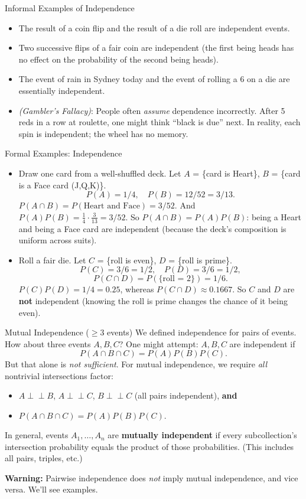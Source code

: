 \documentclass[aspectratio=169,11pt]{beamer} %
\newcommand{\indep}{\perp\!\!\!\perp} %
\begin{document}
\begin{frame}{Informal Examples of Independence}
\begin{itemize}
    \item The result of a coin flip and the result of a die roll are independent events.
    \item Two successive flips of a fair coin are independent (the first being heads has no effect on the probability of the second being heads).
    \item The event of rain in Sydney today and the event of rolling a 6 on a die are essentially independent.
    \item \textit{(Gambler's Fallacy)}: People often \emph{assume} dependence incorrectly. After 5 reds in a row at roulette, one might think ``black is due'' next. In reality, each spin is independent; the wheel has no memory.
\end{itemize}
\end{frame}

\begin{frame}{Formal Examples: Independence}
\begin{itemize}
    \item Draw one card from a well-shuffled deck. Let $A$ = \{card is Heart\}, $B$ = \{card is a Face card (J,Q,K)\}. 
    \[P(A)=1/4, \quad P(B)=12/52 = 3/13.\] 
    $P(A \cap B) = P(\text{Heart and Face}) = 3/52$. And $P(A)P(B) = \frac{1}{4}\cdot\frac{3}{13} = 3/52$. So $P(A \cap B) = P(A)P(B)$: being a Heart and being a Face card are independent (because the deck's composition is uniform across suits).
    
    \item Roll a fair die. Let $C$ = \{roll is even\}, $D$ = \{roll is prime\}. 
    \[P(C) = 3/6 = 1/2, \quad P(D) = 3/6 = 1/2,\] 
    \[P(C \cap D) = P(\{\text{roll = 2}\}) = 1/6.\] 
    $P(C)P(D) = 1/4 = 0.25$, whereas $P(C \cap D) \approx 0.1667$. So $C$ and $D$ are \textbf{not} independent (knowing the roll is prime changes the chance of it being even).
\end{itemize}
\end{frame}

\begin{frame}{Mutual Independence ($\ge 3$ events)}
We defined independence for pairs of events. How about three events $A, B, C$? One might attempt: $A, B, C$ are independent if 
\[ P(A \cap B \cap C) = P(A)P(B)P(C). \]
But that alone is \emph{not sufficient}. For mutual independence, we require \textit{all} nontrivial intersections factor:
\begin{itemize}
    \item $A \indep B$, $A \indep C$, $B \indep C$ (all pairs independent), \textbf{and}
    \item $P(A \cap B \cap C) = P(A)P(B)P(C).$
\end{itemize}
In general, events $A_1, \dots, A_n$ are \textbf{mutually independent} if every subcollection's intersection probability equals the product of those probabilities. (This includes all pairs, triples, etc.)

\textbf{Warning:} Pairwise independence does \emph{not} imply mutual independence, and vice versa. We'll see examples.
\end{frame}
\end{document}

